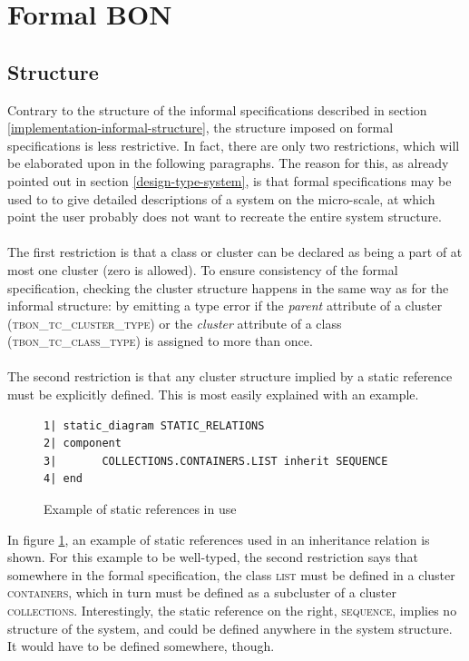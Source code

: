 \section{Formal BON}
\subsection{Structure}
Contrary to the structure of the informal specifications described in section \ref{implementation-informal-structure}, the structure imposed on formal specifications is less restrictive. In fact, there are only two restrictions, which will be elaborated upon in the following paragraphs. The reason for this, as already pointed out in section \ref{design-type-system}, is that formal specifications may be used to to give detailed descriptions of a system on the micro-scale, at which point the user probably does not want to recreate the entire system structure.
\paragraph{}
The first restriction is that a class or cluster can be declared as being a part of at most one cluster (zero is allowed). To ensure consistency of the formal specification, checking the cluster structure happens in the same way as for the informal structure: by emitting a type error if the \textit{parent} attribute of a cluster (\textsc{tbon\_tc\_cluster\_type}) or the \textit{cluster} attribute of a class (\textsc{tbon\_tc\_class\_type}) is assigned to more than once.
\paragraph{}
The second restriction is that any cluster structure implied by a static reference must be explicitly defined. This is most easily explained with an example.
\begin{figure}[H]
{\footnotesize
\begin{verbatim}
1| static_diagram STATIC_RELATIONS
2| component
3|       COLLECTIONS.CONTAINERS.LIST inherit SEQUENCE
4| end
\end{verbatim}
}
\caption{Example of static references in use}
\label{fig:structure_static_references}
\end{figure}
In figure \ref{fig:structure_static_references}, an example of static references used in an inheritance relation is shown. For this example to be well-typed, the second restriction says that somewhere in the formal specification, the class \textsc{list} must be defined in a cluster \textsc{containers}, which in turn must be defined as a subcluster of a cluster \textsc{collections}. Interestingly, the static reference on the right, \textsc{sequence}, implies no structure of the system, and could be defined anywhere in the system structure. It would have to be defined somewhere, though.
